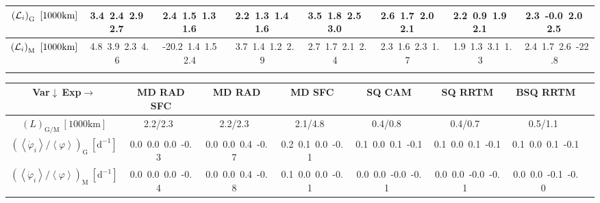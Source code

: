 \begin{table}[H]
{\begin{centering}
\begin{tabular}{|c|c|c|c|c|c|c|c|}
\hline
$\left({\cal L}_{i}\right)_{\mathrm{G}}\ \left[1000\mathrm{km}\right]$ & \textcolor{C1}{3.4}\ \textcolor{C2}{2.4}\ \textcolor{C3}{2.9}\ \textcolor{C4}{2.7}\  & \textcolor{C1}{2.4}\ \textcolor{C2}{1.5}\ \textcolor{C3}{1.3}\ \textcolor{C4}{1.6}\  & \textcolor{C1}{2.2}\ \textcolor{C2}{1.3}\ \textcolor{C3}{1.4}\ \textcolor{C4}{1.6}\  & \textcolor{C1}{3.5}\ \textcolor{C2}{1.8}\ \textcolor{C3}{2.5}\ \textcolor{C4}{3.0}\  & \textcolor{C1}{2.6}\ \textcolor{C2}{1.7}\ \textcolor{C3}{2.0}\ \textcolor{C4}{2.1}\  & \textcolor{C1}{2.2}\ \textcolor{C2}{0.9}\ \textcolor{C3}{1.9}\ \textcolor{C4}{2.1}\  & \textcolor{C1}{2.3}\ \textcolor{C2}{-0.0}\ \textcolor{C3}{2.0}\ \textcolor{C4}{2.5}\  \tabularnewline
\hline
$\left({\cal L}_{i}\right)_{\mathrm{M}}\ \left[1000\mathrm{km}\right]$ & \textcolor{C1}{4.8}\ \textcolor{C2}{3.9}\ \textcolor{C3}{2.3}\ \textcolor{C4}{4.6}\  & \textcolor{C1}{-20.2}\ \textcolor{C2}{1.4}\ \textcolor{C3}{1.5}\ \textcolor{C4}{2.4}\  & \textcolor{C1}{3.7}\ \textcolor{C2}{1.4}\ \textcolor{C3}{1.2}\ \textcolor{C4}{2.9}\  & \textcolor{C1}{2.7}\ \textcolor{C2}{1.7}\ \textcolor{C3}{2.1}\ \textcolor{C4}{2.4}\  & \textcolor{C1}{2.3}\ \textcolor{C2}{1.6}\ \textcolor{C3}{2.3}\ \textcolor{C4}{1.7}\  & \textcolor{C1}{1.9}\ \textcolor{C2}{1.3}\ \textcolor{C3}{3.1}\ \textcolor{C4}{1.3}\  & \textcolor{C1}{2.4}\ \textcolor{C2}{1.7}\ \textcolor{C3}{2.6}\ \textcolor{C4}{-22.8}\  \tabularnewline
\hline
 &  &  &  &  &  &  & \tabularnewline
\hline
\end{tabular}
\begin{tabular}{|c|c|c|c|c|c|c|c|}
\hline
Var$\downarrow\ $Exp$\rightarrow$ & MD RAD SFC & MD RAD & MD SFC & SQ CAM & SQ RRTM & BSQ RRTM \tabularnewline
\hline
\hline
$\left(L\right)_{\mathrm{G/M}}\ \left[1000\mathrm{km}\right]$ & 2.2/2.3\ & 2.2/2.3\ & 2.1/4.8\ & 0.4/0.8\ & 0.4/0.7\ & 0.5/1.1\ \tabularnewline
\hline
$\left(\left\langle \dot{\varphi}_{i}\right\rangle /\left\langle \varphi\right\rangle\right) _{\mathrm{G}}\ \left[\mathrm{d^{-1}}\right]$ & \textcolor{C1}{0.0}\ \textcolor{C2}{0.0}\ \textcolor{C3}{0.0}\ \textcolor{C4}{-0.3}\  & \textcolor{C1}{0.0}\ \textcolor{C2}{0.0}\ \textcolor{C3}{0.4}\ \textcolor{C4}{-0.7}\  & \textcolor{C1}{0.2}\ \textcolor{C2}{0.1}\ \textcolor{C3}{0.0}\ \textcolor{C4}{-0.1}\  & \textcolor{C1}{0.1}\ \textcolor{C2}{0.0}\ \textcolor{C3}{0.1}\ \textcolor{C4}{-0.1}\  & \textcolor{C1}{0.1}\ \textcolor{C2}{0.0}\ \textcolor{C3}{0.1}\ \textcolor{C4}{-0.1}\  & \textcolor{C1}{0.1}\ \textcolor{C2}{0.0}\ \textcolor{C3}{0.1}\ \textcolor{C4}{-0.1}\  \tabularnewline
\hline
$\left(\left\langle \dot{\varphi}_{i}\right\rangle /\left\langle \varphi\right\rangle\right) _{\mathrm{M}}\ \left[\mathrm{d^{-1}}\right]$ & \textcolor{C1}{0.0}\ \textcolor{C2}{0.0}\ \textcolor{C3}{0.0}\ \textcolor{C4}{-0.4}\  & \textcolor{C1}{0.0}\ \textcolor{C2}{0.0}\ \textcolor{C3}{0.4}\ \textcolor{C4}{-0.8}\  & \textcolor{C1}{0.1}\ \textcolor{C2}{0.0}\ \textcolor{C3}{0.0}\ \textcolor{C4}{-0.1}\  & \textcolor{C1}{0.0}\ \textcolor{C2}{0.0}\ \textcolor{C3}{-0.0}\ \textcolor{C4}{-0.1}\  & \textcolor{C1}{0.0}\ \textcolor{C2}{0.0}\ \textcolor{C3}{-0.0}\ \textcolor{C4}{-0.1}\  & \textcolor{C1}{0.0}\ \textcolor{C2}{0.0}\ \textcolor{C3}{-0.1}\ \textcolor{C4}{-0.0}\  \tabularnewline

\end{tabular}
\end{centering}}
\end{table}
